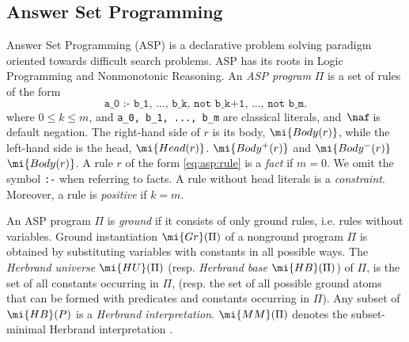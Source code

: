 




\subsection{Answer Set Programming}

Answer Set Programming (ASP) \parencite{GL1988} %
is a declarative problem solving paradigm oriented towards difficult search problems. ASP has its roots in Logic Programming and Nonmonotonic Reasoning.
An \emph{ASP program} $\Pi$ is a set of rules of the form
\begin{equation}
    \label{eq:asp:rule}
    \texttt{a\_0 :- b\_1, ..., b\_k, not b\_{k+1}, ..., not b\_m.}
\end{equation}
where $0 \leq k \leq m $,  and \texttt{a\_0, b\_1, ..., b\_m} are classical literals, and \,{$\naf$}\,is %
default negation. The right-hand side of $r$ is its body, $\mi{Body(r)}$, while the left-hand side is the head, $\mi{Head(r)}$.  $\mi{Body^+(r)}$ and $\mi{Body^-(r)}$  $\mi{Body(r)}$. A rule $r$ of the form \eqref{eq:asp:rule} is %
a \emph{fact} if $m=0$. We omit the symbol \texttt{:-} when referring to facts.  A rule without head literals is a \emph{constraint}. Moreover, a rule is \emph{positive} if $k=m$.

An ASP program $\Pi$ is \emph{ground} if it consists of only ground rules, i.e. rules without
variables. Ground instantiation $\mi{Gr}(\Pi)$ of a nonground program $\Pi$ is obtained by substituting variables with constants in all possible ways. The \emph{Herbrand universe}  $\mi{HU}(\Pi)$ (resp. \emph{Herbrand base} $\mi{HB}(\Pi)$) of $\Pi$, is the set of all constants occurring in $\Pi$, (resp. the set of all possible ground atoms that can be formed with predicates and constants occurring in $\Pi$). Any subset of $\mi{HB}(P)$ is a \emph{Herbrand interpretation}. ${\mi{MM}(\Pi)}$ denotes the subset-minimal Herbrand interpretation . 


